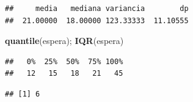 \documentclass[
]{book}
\newenvironment{Shaded}{\begin{snugshade}}{\end{snugshade}}
\newcommand{\FunctionTok}[1]{\textcolor[rgb]{0.13,0.29,0.53}{\textbf{#1}}}
\newcommand{\NormalTok}[1]{#1}
\newcommand{\SpecialCharTok}[1]{\textcolor[rgb]{0.81,0.36,0.00}{\textbf{#1}}}
\begin{document}
\begin{enumerate}
\begin{verbatim}
##     media   mediana variancia        dp 
##  21.00000  18.00000 123.33333  11.10555
\end{verbatim}

\begin{Shaded}
\begin{Highlighting}[]
\FunctionTok{quantile}\NormalTok{(espera); }\FunctionTok{IQR}\NormalTok{(espera)}
\end{Highlighting}
\end{Shaded}

\begin{verbatim}
##   0%  25%  50%  75% 100% 
##   12   15   18   21   45
\end{verbatim}

\begin{verbatim}
## [1] 6
\end{verbatim}

\begin{Shaded}
\end{Shaded}


\end{enumerate}
\end{document}
